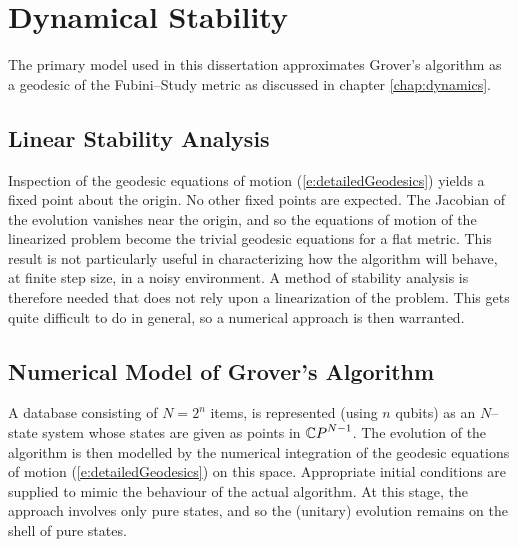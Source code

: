 
\chapter{Dynamical Stability}
\label{chap:dynamicalStability}
%


The primary model used in this dissertation approximates 
Grover's algorithm as a geodesic of the Fubini--Study metric 
as discussed in chapter \ref{chap:dynamics}.

\section{Linear Stability Analysis}

Inspection of the geodesic equations of motion 
(\ref{e:detailedGeodesics}) yields a fixed point about the 
origin.  No other fixed points are expected. 
The Jacobian of the evolution vanishes near the origin, and
so the equations of motion of the linearized problem become
the trivial geodesic equations for a flat metric.
This result is not particularly useful in characterizing how 
the algorithm will behave, at finite step size, in a noisy 
environment.  
A method of stability analysis
is therefore needed that does not rely upon a linearization
of the problem.  This gets quite difficult to do in general,
so a numerical approach is then warranted.

\section{Numerical Model of Grover's Algorithm}

A database consisting of $N=2^n$ items, is represented (using
$n$ qubits) as an $N$--state system whose states are given as
points in ${\mathbb{C} P}^{N-1}$.  The evolution of the algorithm is then 
modelled by the numerical integration of the geodesic equations 
of motion (\ref{e:detailedGeodesics}) on this space.
Appropriate initial conditions are supplied to mimic the behaviour of 
the actual algorithm.  At this stage, the approach involves only pure 
states, and so the (unitary) evolution remains on the shell of pure 
states.

